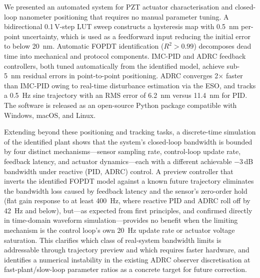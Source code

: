 \documentclass[fleqn,10pt]{wlscirep}
\begin{document}
We presented an automated system for PZT actuator characterisation and closed-loop nanometer positioning that requires no manual parameter tuning. A bidirectional 0.1\,V-step LUT sweep constructs a hysteresis map with \SI{0.5}{nm} per-point uncertainty, which is used as a feedforward input reducing the initial error to below \SI{20}{nm}. Automatic FOPDT identification ($R^2 > 0.99$) decomposes dead time into mechanical and protocol components. IMC-PID and ADRC feedback controllers, both tuned automatically from the identified model, achieve sub-\SI{5}{nm} residual errors in point-to-point positioning. ADRC converges 2$\times$ faster than IMC-PID owing to real-time disturbance estimation via the ESO, and tracks a \SI{0.5}{Hz} sine trajectory with an RMS error of \SI{6.2}{nm} versus \SI{11.4}{nm} for PID. The software is released as an open-source Python package compatible with Windows, macOS, and Linux.

Extending beyond these positioning and tracking tasks, a discrete-time simulation of the identified plant shows that the system's closed-loop bandwidth is bounded by four distinct mechanisms---sensor sampling rate, control-loop update rate, feedback latency, and actuator dynamics---each with a different achievable $-3$\,dB bandwidth under reactive (PID, ADRC) control. A preview controller that inverts the identified FOPDT model against a known future trajectory eliminates the bandwidth loss caused by feedback latency and the sensor's zero-order hold (flat gain response to at least \SI{400}{Hz}, where reactive PID and ADRC roll off by \SI{42}{Hz} and below), but---as expected from first principles, and confirmed directly in time-domain waveform simulation---provides no benefit when the limiting mechanism is the control loop's own \SI{20}{Hz} update rate or actuator voltage saturation. This clarifies which class of real-system bandwidth limits is addressable through trajectory preview and which requires faster hardware, and identifies a numerical instability in the existing ADRC observer discretisation at fast-plant/slow-loop parameter ratios as a concrete target for future correction.


%
\end{document}
